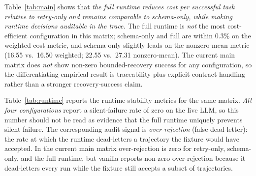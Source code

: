 \begin{table}[t]
    \centering
    \caption{Main \mbox{$\tau^3$}-bench results, task-weighted across 216 sampled executions per method over 36 distinct task-trial instances spanning airline + retail + telecom, concurrency 1/5 and fault rates 0/0.1/0.2. ``Fixture'' is the fixture-backed assertion score derived from public benchmark metadata, not a full benchmark-native simulator rerun; ``Runtime'' is the contractual runtime's final state; ``Bounded recovery'' counts only the recovery controller. Cost / success is reported both task-weighted and as the mean over non-empty cells. \emph{Over-rejection} is the rate at which the runtime dead-letters a fixture-acceptable trajectory.}
    \label{tab:main}
\end{table}

Table~\ref{tab:main} shows that \emph{the full runtime reduces cost per successful task relative to retry-only and remains comparable to schema-only, while making runtime decisions auditable in the trace.}  The full runtime is \emph{not} the most cost-efficient configuration in this matrix; schema-only and full are within 0.3\% on the weighted cost metric, and schema-only slightly leads on the nonzero-mean metric (16.55 vs.\ 16.50 weighted; 22.55 vs.\ 27.31 nonzero-mean).  The current main matrix does \emph{not} show non-zero bounded-recovery success for any configuration, so the differentiating empirical result is traceability plus explicit contract handling rather than a stronger recovery-success claim.

Table~\ref{tab:runtime} reports the runtime-stability metrics for the same matrix. \emph{All four configurations} report a silent-failure rate of zero on the live LLM, so this number should not be read as evidence that the full runtime uniquely prevents silent failure. The corresponding audit signal is \emph{over-rejection} (false dead-letter): the rate at which the runtime dead-letters a trajectory the fixture would have accepted.  In the current main matrix over-rejection is zero for retry-only, schema-only, and the full runtime, but vanilla reports non-zero over-rejection because it dead-letters every run while the fixture still accepts a subset of trajectories.

